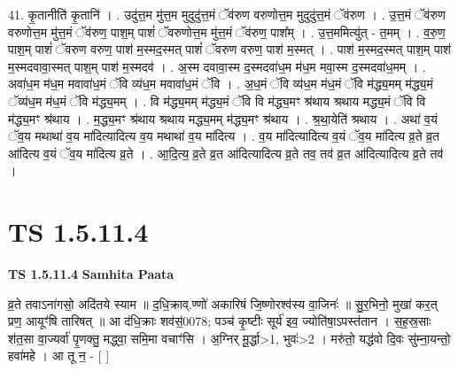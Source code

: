 \documentclass[17pt]{extarticle}
\begin{document}
41. कृ॒तानीति॑ कृ॒तानि॑ । . उदु॑त्त॒म मु॑त्त॒म मुदुदु॑त्त॒मं ॅव॑रुण वरुणोत्त॒म मुदुदु॑त्त॒मं ॅव॑रुण । . उ॒त्त॒मं ॅव॑रुण वरुणोत्त॒म मु॑त्त॒मं ॅव॑रुण॒ पाश॒म् पाशं॑ ॅवरुणोत्त॒म मु॑त्त॒मं ॅव॑रुण॒ पाश᳚म् । . उ॒त्त॒ममित्यु॑त् - त॒मम् । . व॒रु॒ण॒ पाश॒म् पाशं॑ ॅवरुण वरुण॒ पाश॑ म॒स्मद॒स्मत् पाशं॑ ॅवरुण वरुण॒ पाश॑ म॒स्मत् । . पाश॑ म॒स्मद॒स्मत् पाश॒म् पाश॑ म॒स्मदवावा॒स्मत् पाश॒म् पाश॑ म॒स्मदव॑ । . अ॒स्म दवावा॒स्म द॒स्मदवा॑ध॒म म॑ध॒म मवा॒स्म द॒स्मदवा॑ध॒मम् । . अवा॑ध॒म म॑ध॒म मवावा॑ध॒मं ॅवि व्य॑ध॒म मवावा॑ध॒मं ॅवि । . अ॒ध॒मं ॅवि व्य॑ध॒म म॑ध॒मं ॅवि म॑द्ध्य॒मम् म॑द्ध्य॒मं ॅव्य॑ध॒म म॑ध॒मं ॅवि म॑द्ध्य॒मम् । . वि म॑द्ध्य॒मम् म॑द्ध्य॒मं ॅवि वि म॑द्ध्य॒मꣳ श्र॑थाय श्रथाय मद्ध्य॒मं ॅवि वि म॑द्ध्य॒मꣳ श्र॑थाय । . म॒द्ध्य॒मꣳ श्र॑थाय श्रथाय मद्ध्य॒मम् म॑द्ध्य॒मꣳ श्र॑थाय । . श्र॒था॒येति॑ श्रथाय । . अथा॑ व॒यं ॅव॒य मथाथा॑ व॒य मा॑दित्यादित्य व॒य मथाथा॑ व॒य मा॑दित्य । . व॒य मा॑दित्यादित्य व॒यं ॅव॒य मा॑दित्य व्र॒ते व्र॒त आ॑दित्य व॒यं ॅव॒य मा॑दित्य व्र॒ते । . आ॒दि॒त्य॒ व्र॒ते व्र॒त आ॑दित्यादित्य व्र॒ते तव॒ तव॑ व्र॒त आ॑दित्यादित्य व्र॒ते तव॑ । \newline
\pagebreak
{}

\section{ TS 1.5.11.4 }

\textbf{TS 1.5.11.4 } \newline
\textbf{Samhita Paata} \newline

व्र॒ते तवाऽना॑गसो॒ अदि॑तये स्याम ॥ द॒धि॒क्राव्.ण्णो॑ अकारिषं जि॒ष्णोरश्व॑स्य वा॒जिनः॑ ॥ सु॒र॒भिनो॒ मुखा॑ कर॒त् प्रण॒ आयूꣳ॑षि तारिषत् ॥ आ द॑धि॒क्राः शव॑स॒॑0078; पञ्च॑ कृ॒ष्टीः सूर्य॑ इव॒ ज्योति॑षा॒ऽपस्त॑तान । स॒ह॒स्र॒साः श॑त॒सा वा॒ज्यर्वा॑ पृ॒णक्तु॒ मद्ध्वा॒ समि॒मा वचाꣳ॑सि । अ॒ग्निर् मू॒र्द्धा>1, भुवः॑>2 । मरु॑तो॒ यद्ध॑वो दि॒वः सु॑म्ना॒यन्तो॒ हवा॑महे । आ तू न॒ - [ ] \newline
\end{document}
